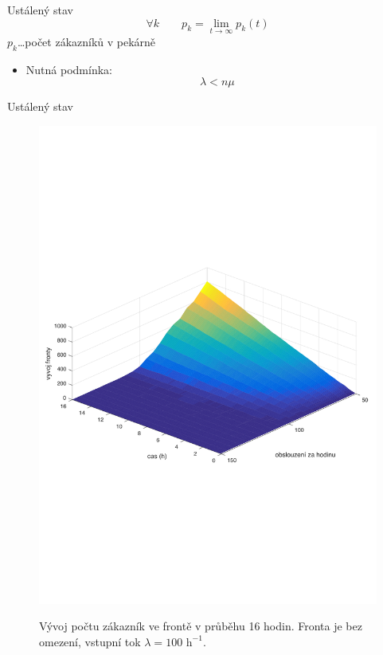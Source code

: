 \begin{frame}{Ustálený stav}
\[\forall k \qquad p_k = \lim_{t\to\infty} p_k(t)\]
\(p_k\)\ldots počet zákazníků v pekárně
\begin{itemize}
	\item Nutná podmínka: \[\lambda < n\mu \]
\end{itemize}
\end{frame}
\begin{frame}{Ustálený stav}
\begin{figure}
\centering
\includegraphics[width=0.8\columnwidth]{imgs/fronta.pdf}
\label{fig:fronta}
\caption{Vývoj počtu zákazník ve frontě v průběhu 16 hodin. Fronta je bez omezení, vstupní tok \(\lambda = 100 \mbox{~h}^{-1}\). }
\end{figure}
\end{frame}